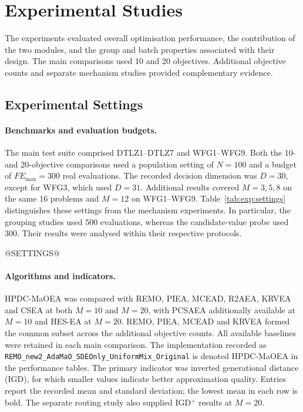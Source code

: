 \section{Experimental Studies}
\label{sec:exp}

The experiments evaluated overall optimisation performance, the contribution
of the two modules, and the group and batch properties associated with their
design. The main comparisons used 10 and 20 objectives. Additional objective
counts and separate mechanism studies provided complementary evidence.

\subsection{Experimental Settings}
\label{sec:exp:settings}

\paragraph{Benchmarks and evaluation budgets.}
The main test suite comprised DTLZ1--DTLZ7 and WFG1--WFG9. Both the 10- and
20-objective comparisons used a population setting of $N=100$ and a budget of
$FE_{\max}=300$ real evaluations. The recorded decision dimension was $D=30$,
except for WFG3, which used $D=31$. Additional results covered $M=3,5,8$ on the
same 16 problems and $M=12$ on WFG1--WFG9. Table~\ref{tab:exp:settings}
distinguishes these settings from the mechanism experiments. In particular,
the grouping studies used 500 evaluations, whereas the candidate-value probe
used 300. Their results were analysed within their respective protocols.

@SETTINGS@

\paragraph{Algorithms and indicators.}
HPDC-MaOEA was compared with REMO, PIEA, MCEAD, R2AEA, KRVEA and CSEA at both
$M=10$ and $M=20$, with PCSAEA additionally available at $M=10$ and HES-EA at
$M=20$. REMO, PIEA, MCEAD and KRVEA formed the common subset across the
additional objective counts. All available baselines were retained in each
main comparison. The implementation recorded as
\texttt{REMO\_new2\_AdaMaO\_SDEOnly\_UniformMix\_Original} is denoted
HPDC-MaOEA in the performance tables.
The primary indicator was inverted generational distance (IGD), for which
smaller values indicate better approximation quality. Entries report the
recorded mean and standard deviation; the lowest mean in each row is bold.
The separate routing study also supplied IGD$^+$ results at $M=20$.

